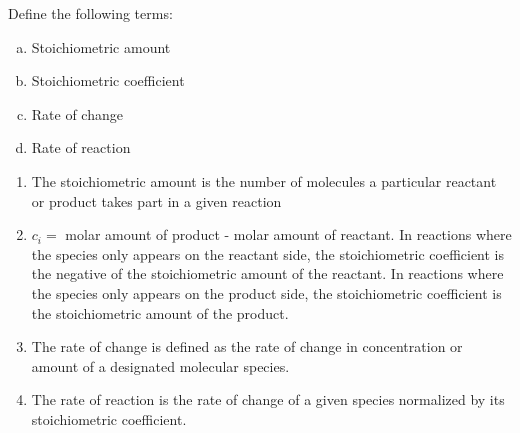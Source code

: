 \documentclass[12pt]{article}
\begin{document}
\begin{question}
Define the following terms:
\begin{enumerate}[a)]
  \item Stoichiometric amount
  \item Stoichiometric coefficient
  \item Rate of change
  \item Rate of reaction
\end{enumerate}
\end{question}
\begin{solution}
\begin{enumerate}

\item The stoichiometric amount is the number of molecules a particular reactant or product
takes part in a given reaction

\item $c_i = $ molar amount of product - molar amount of reactant. In reactions where the species only appears on the reactant side, the stoichiometric coefficient is the negative of the stoichiometric amount of the reactant. In reactions where the species only appears on the product side, the stoichiometric coefficient is the stoichiometric amount of the product.

\item The rate of change is defined as the rate of change in concentration or amount of a designated molecular species.

\item The rate of reaction is the rate of change of a given species normalized by its stoichiometric coefficient.

\end{enumerate}
\end{solution}
\end{document}
